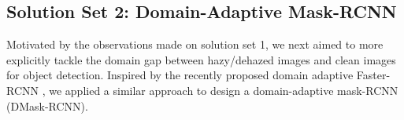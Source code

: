 \documentclass[10pt,twocolumn,letterpaper]{article}
\begin{document}

\subsection{Solution Set 2: Domain-Adaptive Mask-RCNN} %

Motivated by the observations made on solution set 1, we next aimed to more explicitly tackle the domain gap between hazy/dehazed images and clean images for object detection. Inspired by the recently proposed domain adaptive Faster-RCNN \cite{chen2018domain}, we applied a similar approach to design a domain-adaptive mask-RCNN (DMask-RCNN). 


\end{document}
